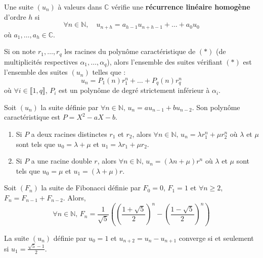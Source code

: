   \begin{definition}
    Une suite $(u_n)$ à valeurs dans $\mathbb{C}$ vérifie une \textbf{récurrence linéaire homogène} d'ordre $h$ si
    \[ \forall n \in \mathbb{N}, \quad u_{n+h} = a_{h-1} u_{n+h-1} + \dots + a_0 u_0 \tag{$*$} \]
    où $a_1, \dots, a_h \in \mathbb{C}$.
  \end{definition}

  \begin{proposition}
    Si on note $r_1, \dots, r_q$ les racines du polynôme caractéristique de $(*)$ (de multiplicités respectives $\alpha_1, \dots, \alpha_q$), alors l'ensemble des suites vérifiant $(*)$ est l'ensemble des suites $(u_n)$ telles que :
    \[ u_n = P_1(n) r_1^n + \dots + P_q(n) r_q^n \]
    où $\forall i \in \llbracket 1, q \rrbracket$, $P_i$ est un polynôme de degré strictement inférieur à $\alpha_i$.
  \end{proposition}

  \begin{example}
    Soit $(u_n)$ la suite définie par $\forall n \in \mathbb{N}, \, u_n = a u_{n-1} + b u_{n-2}$. Son polynôme caractéristique est $P = X^2 - aX - b$.
    \begin{enumerate}
      \item Si $P$ a deux racines distinctes $r_1$ et $r_2$, alors $\forall n \in \mathbb{N}, \, u_n = \lambda r_1^n + \mu r_2^n$ où $\lambda$ et $\mu$ sont tels que $u_0 = \lambda + \mu$ et $u_1 = \lambda r_1 + \mu r_2$.
      \item Si $P$ a une racine double $r$, alors $\forall n \in \mathbb{N}, \, u_n = (\lambda n + \mu) r^n$ où $\lambda$ et $\mu$ sont tels que $u_0 = \mu$ et $u_1 = (\lambda + \mu) r$.
    \end{enumerate}
  \end{example}


  \begin{example}
    Soit $(F_n)$ la suite de Fibonacci définie par $F_0 = 0$, $F_1 = 1$ et $\forall n \geq 2$, $F_n = F_{n-1} + F_{n-2}$. Alors,
    \[ \forall n \in \mathbb{N}, \, F_n = \frac{1}{\sqrt{5}} \left ( \left ( \frac{1 + \sqrt{5}}{2} \right)^n - \left ( \frac{1 - \sqrt{5}}{2} \right)^n \right) \]
  \end{example}

  \begin{example}
    La suite $(u_n)$ définie par $u_0 = 1$ et $u_{n+2} = u_n - u_{n+1}$ converge si et seulement si $u_1 = \frac{\sqrt{5}-1}{2}$.
  \end{example}

